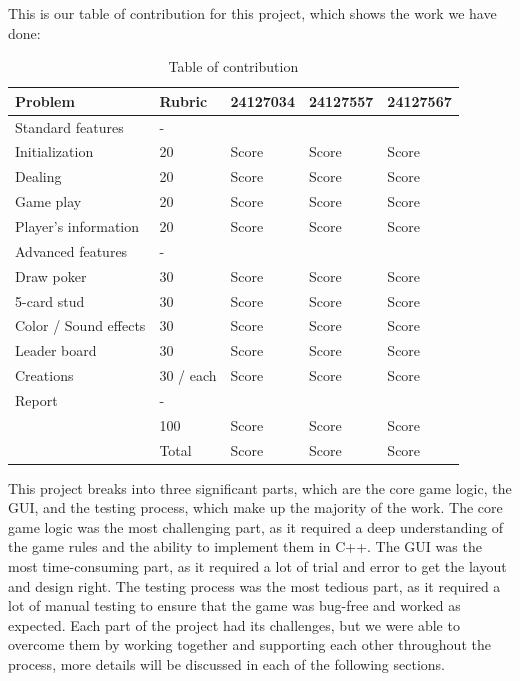 \hspace{1cm} This is our table of contribution for this project, which shows the work we have done:
\begin{table}[ht]
    \centering
    \begin{tabular}{|m{4cm}|m{2cm}|m{2cm}|m{2cm}| m{2cm}|}
    \hline
    \textbf{Problem} & \textbf{Rubric} & \textbf{24127034} & \textbf{24127557} & \textbf{24127567} \\
    \hline
    Standard features & - &  &  &  \\
    \hline
    Initialization & 20 & Score & Score & Score \\
    \hline
    Dealing & 20 & Score & Score & Score \\
    \hline 
    Game play & 20 & Score & Score & Score \\
    \hline
    Player's information & 20 & Score & Score & Score \\
    \hline
    Advanced features & - &  &  &  \\
    \hline 
    Draw poker & 30 & Score & Score & Score \\
    \hline
    5-card stud & 30 & Score & Score & Score \\
    \hline
    Color / Sound effects & 30 & Score & Score & Score \\
    \hline
    Leader board & 30 & Score & Score & Score \\
    \hline
    Creations & 30 / each & Score & Score & Score \\
    \hline
    Report & - &  &  &  \\
    \hline
     & 100 & Score & Score & Score \\
    \hline
    & Total & Score & Score & Score \\
    \hline
    \end{tabular}
    \caption{Table of contribution}
    \label{tab:contribution-table}
\end{table}

\hspace{1cm} This project breaks into three significant parts, which are the core game logic, the GUI, and the testing process, which make up the majority of the work. The core game logic was the most challenging part, as it required a deep understanding of the game rules and the ability to implement them in C++. The GUI was the most time-consuming part, as it required a lot of trial and error to get the layout and design right. The testing process was the most tedious part, as it required a lot of manual testing to ensure that the game was bug-free and worked as expected. Each part of the project had its challenges, but we were able to overcome them by working together and supporting each other throughout the process, more details will be discussed in each of the following sections.

